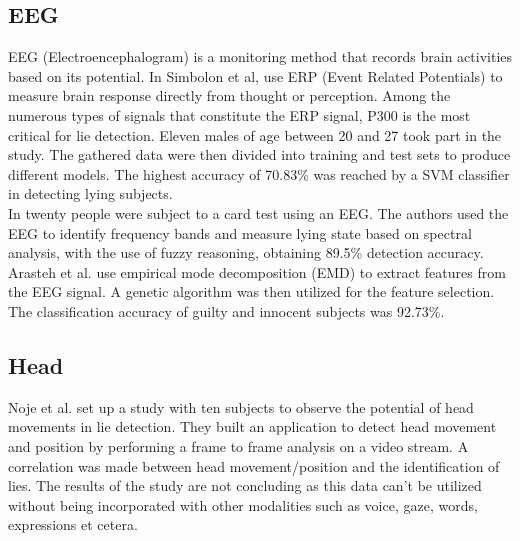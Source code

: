 \documentclass[LaM,binding=0.6cm,english,noexaminfo]{sapthesis}
\begin{document}
\subsection*{EEG}
EEG (Electroencephalogram) is a monitoring method that records brain activities based on its potential. 
In \cite{7440177}  Simbolon et al, use ERP (Event Related Potentials) to measure brain response directly from thought or perception. Among the numerous types of signals that constitute the ERP signal, P300 is the most critical for lie detection. Eleven males of age between 20 and 27 took part in the study. The gathered data were then divided into training and test sets to produce different models. The highest accuracy of 70.83\% was reached by a SVM classifier in detecting lying subjects.\\
In \cite{Lai2017} twenty people were subject to a card test using an EEG. The authors used the EEG to identify frequency bands and measure lying state based on spectral analysis, with the use of fuzzy reasoning, obtaining 89.5\% detection accuracy. \\
Arasteh et al. \cite{7511728} use empirical mode decomposition (EMD) to extract features from the EEG signal. A genetic algorithm was then utilized for the feature selection. The classification accuracy of guilty and innocent subjects was 92.73\%.

\subsection*{Head}
Noje et al. \cite{7367432} set up a study with ten subjects to observe the potential of head movements in lie detection. They built an application to detect head movement and position by performing a frame to frame analysis on a video stream. A correlation was made between head movement/position and the identification of lies. The results of the study are not concluding as this data can't be utilized without being incorporated with other modalities such as voice, gaze, words, expressions et cetera.
\end{document}
